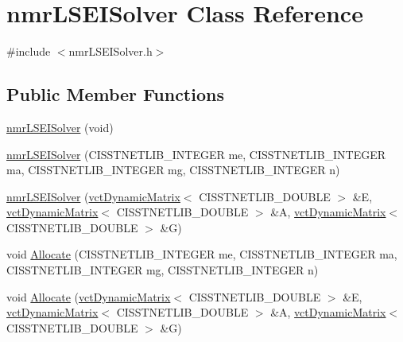 \hypertarget{classnmr_l_s_e_i_solver}{}\section{nmr\+L\+S\+E\+I\+Solver Class Reference}
\label{classnmr_l_s_e_i_solver}


{\ttfamily \#include $<$nmr\+L\+S\+E\+I\+Solver.\+h$>$}

\subsection*{Public Member Functions}
\begin{DoxyCompactItemize}
\item 
\hyperlink{classnmr_l_s_e_i_solver_a6e7f8748f3a8698d5de14e9b5040bbb5}{nmr\+L\+S\+E\+I\+Solver} (void)
\item 
\hyperlink{classnmr_l_s_e_i_solver_a058f80909183378dcb2da3981728304b}{nmr\+L\+S\+E\+I\+Solver} (C\+I\+S\+S\+T\+N\+E\+T\+L\+I\+B\+\_\+\+I\+N\+T\+E\+G\+E\+R me, C\+I\+S\+S\+T\+N\+E\+T\+L\+I\+B\+\_\+\+I\+N\+T\+E\+G\+E\+R ma, C\+I\+S\+S\+T\+N\+E\+T\+L\+I\+B\+\_\+\+I\+N\+T\+E\+G\+E\+R mg, C\+I\+S\+S\+T\+N\+E\+T\+L\+I\+B\+\_\+\+I\+N\+T\+E\+G\+E\+R n)
\item 
\hyperlink{classnmr_l_s_e_i_solver_aa9c31ea2a4b4db848a440455e13d7bb9}{nmr\+L\+S\+E\+I\+Solver} (\hyperlink{classvct_dynamic_matrix}{vct\+Dynamic\+Matrix}$<$ C\+I\+S\+S\+T\+N\+E\+T\+L\+I\+B\+\_\+\+D\+O\+U\+B\+L\+E $>$ \&E, \hyperlink{classvct_dynamic_matrix}{vct\+Dynamic\+Matrix}$<$ C\+I\+S\+S\+T\+N\+E\+T\+L\+I\+B\+\_\+\+D\+O\+U\+B\+L\+E $>$ \&A, \hyperlink{classvct_dynamic_matrix}{vct\+Dynamic\+Matrix}$<$ C\+I\+S\+S\+T\+N\+E\+T\+L\+I\+B\+\_\+\+D\+O\+U\+B\+L\+E $>$ \&G)
\item 
void \hyperlink{classnmr_l_s_e_i_solver_a73eefde3e072df37fc2ed0f3861a022f}{Allocate} (C\+I\+S\+S\+T\+N\+E\+T\+L\+I\+B\+\_\+\+I\+N\+T\+E\+G\+E\+R me, C\+I\+S\+S\+T\+N\+E\+T\+L\+I\+B\+\_\+\+I\+N\+T\+E\+G\+E\+R ma, C\+I\+S\+S\+T\+N\+E\+T\+L\+I\+B\+\_\+\+I\+N\+T\+E\+G\+E\+R mg, C\+I\+S\+S\+T\+N\+E\+T\+L\+I\+B\+\_\+\+I\+N\+T\+E\+G\+E\+R n)
\item 
void \hyperlink{classnmr_l_s_e_i_solver_a25ef0163be6aaf1adc2f91b7aa9a49d2}{Allocate} (\hyperlink{classvct_dynamic_matrix}{vct\+Dynamic\+Matrix}$<$ C\+I\+S\+S\+T\+N\+E\+T\+L\+I\+B\+\_\+\+D\+O\+U\+B\+L\+E $>$ \&E, \hyperlink{classvct_dynamic_matrix}{vct\+Dynamic\+Matrix}$<$ C\+I\+S\+S\+T\+N\+E\+T\+L\+I\+B\+\_\+\+D\+O\+U\+B\+L\+E $>$ \&A, \hyperlink{classvct_dynamic_matrix}{vct\+Dynamic\+Matrix}$<$ C\+I\+S\+S\+T\+N\+E\+T\+L\+I\+B\+\_\+\+D\+O\+U\+B\+L\+E $>$ \&G)

\end{DoxyCompactItemize}
